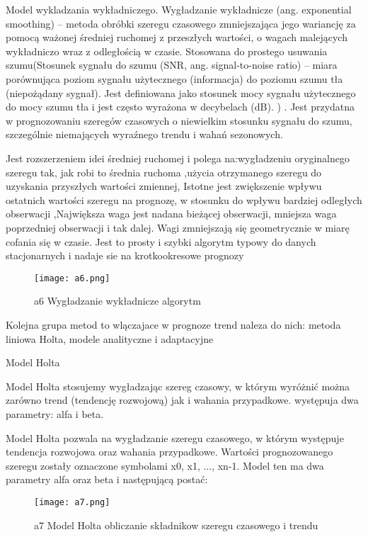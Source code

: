 Model wykladzania wykładniczego.
Wygładzanie wykładnicze (ang. exponential smoothing) – metoda obróbki szeregu czasowego zmniejszająca jego wariancję za pomocą ważonej średniej ruchomej z przeszłych wartości, o wagach malejących wykładniczo wraz z odległością w czasie. Stosowana do prostego usuwania szumu(Stosunek sygnału do szumu (SNR, ang. signal-to-noise ratio) – miara porównująca poziom sygnału użytecznego (informacja) do poziomu szumu tła (niepożądany sygnał). Jest definiowana jako stosunek mocy sygnału użytecznego do mocy szumu tła i jest często wyrażona w decybelach (dB). ) . Jest przydatna w prognozowaniu szeregów czasowych o niewielkim stosunku sygnału do szumu, szczególnie niemających wyraźnego trendu i wahań sezonowych. \cite{wyg2023}

Jest rozszerzeniem idei średniej ruchomej i polega na:wygładzeniu oryginalnego szeregu tak, jak robi to średnia ruchoma ,użycia otrzymanego szeregu do uzyskania przyszłych wartości 
zmiennej, Istotne jest zwiększenie wpływu ostatnich wartości szeregu na 
prognozę, w stosunku do wpływu bardziej odległych obserwacji ,Największa waga jest nadana bieżącej obserwacji, mniejsza waga poprzedniej obserwacji i tak dalej. Wagi zmniejszają się 
geometrycznie w miarę cofania się w czasie. Jest to prosty i szybki algorytm typowy do danych stacjonarnych i nadaje sie na krotkookresowe prognozy\cite{szer2009}


\begin{figure}[h!]
    \label{fig:a6}
    \centering \texttt{[image: a6.png]}
    \caption{a6 Wygładzanie wykładnicze algorytm\cite{szer2009}}
\end{figure}


Kolejna grupa metod to wlączajace w prognoze trend naleza do nich:  metoda liniowa Holta, modele analityczne i adaptacyjne

Model Holta

Model Holta stosujemy wygładzając szereg czasowy, w którym wyróżnić można zarówno trend (tendencję rozwojową) jak i wahania przypadkowe.  występuja dwa parametry: alfa i beta.\cite{hol2023}

Model Holta pozwala na wygładzanie szeregu czasowego, w którym występuje tendencja rozwojowa oraz wahania przypadkowe. Wartości prognozowanego szeregu zostały oznaczone symbolami x0, x1, ..., xn-1. Model ten ma dwa parametry alfa oraz beta i następującą postać:
\begin{figure}[h!]
    \label{fig:a7}
    \centering \texttt{[image: a7.png]}
    \caption{a7 Model Holta  obliczanie składnikow szeregu czasowego i trendu\cite{szos2012}}
\end{figure}

